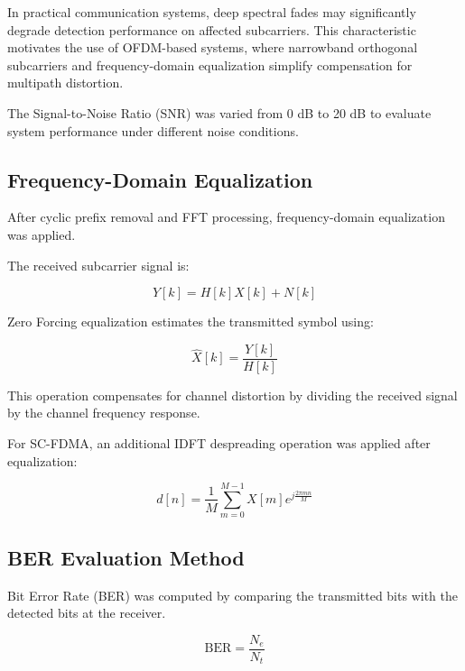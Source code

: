 In practical communication systems, deep spectral fades may significantly
degrade detection performance on affected subcarriers. This characteristic
motivates the use of OFDM-based systems, where narrowband orthogonal
subcarriers and frequency-domain equalization simplify compensation for
multipath distortion.

The Signal-to-Noise Ratio (SNR) was varied from 0 dB to 20 dB to evaluate
system performance under different noise conditions.

\subsection{Frequency-Domain Equalization}

After cyclic prefix removal and FFT processing, frequency-domain
equalization was applied.

The received subcarrier signal is:

\begin{equation}
Y[k]=H[k]X[k]+N[k]
\end{equation}

Zero Forcing equalization estimates the transmitted symbol using:

\begin{equation}
\hat{X}[k]=\frac{Y[k]}{H[k]}
\end{equation}

This operation compensates for channel distortion by dividing the received
signal by the channel frequency response.

For SC-FDMA, an additional IDFT despreading operation was applied after
equalization:

\begin{equation}
d[n]=\frac{1}{M}
\sum_{m=0}^{M-1}
X[m]e^{j\frac{2\pi mn}{M}}
\end{equation}

\subsection{BER Evaluation Method}

Bit Error Rate (BER) was computed by comparing the transmitted bits with
the detected bits at the receiver.

\begin{equation}
\mathrm{BER}
=
\frac{N_e}{N_t}
\end{equation}

